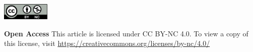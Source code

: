 \vspace{8mm}
\noindent
\includegraphics[height=8mm]{licenses/by-nc}

\begin{spacing}{.6}
\noindent
\textbf{Open Access} This article is licensed under CC BY-NC 4.0. To view a copy of this license, visit \url{https://creativecommons.org/licenses/by-nc/4.0/}
\end{spacing}